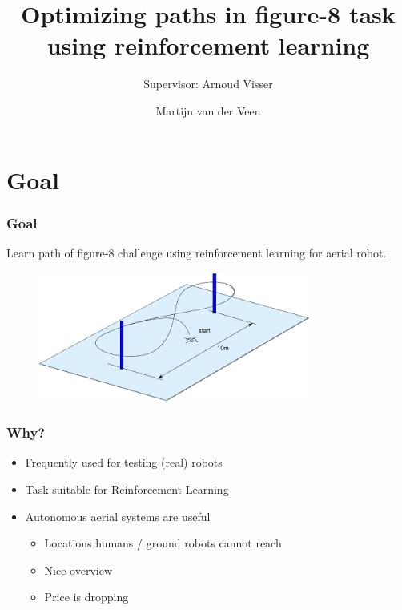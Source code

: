 \documentclass[10pt]{beamer}
\title{Optimizing paths in figure-8 task using reinforcement learning}
\subtitle{\small Supervisor: Arnoud Visser}
\author{Martijn van der Veen}
\institute{University of Amsterdam}
\begin{document}
\begin{frame}
\begin{center}


\end{center}
\titlepage
\end{frame}

% 

\begin{frame}
\tableofcontents
\end{frame}

\section{Goal}
\begin{frame}
 \frametitle{Goal}
 Learn path of figure-8 challenge using reinforcement learning for aerial robot.
 \begin{figure}
  \includegraphics[width=0.8\textwidth]{img/imav2011_pylon}
 \end{figure}
\end{frame}

\begin{frame}
 \frametitle{Why?}
 \begin{itemize}
   \item Frequently used for testing (real) robots
   \item Task suitable for Reinforcement Learning
   \item Autonomous aerial systems are useful
   \begin{itemize}
     \item Locations humans / ground robots cannot reach
     \item Nice overview
     \item Price is dropping
   \end{itemize}
 \end{itemize}
\end{frame}
\end{document}
